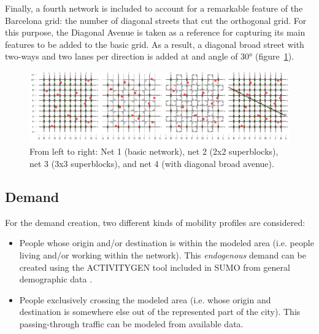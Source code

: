 \documentclass[11pt]{article}
\begin{document}
Finally, a fourth network is included to account for a remarkable feature of the Barcelona grid: the number of diagonal streets that cut the orthogonal grid. For this purpose, the Diagonal Avenue is taken as a reference for capturing its main features to be added to the basic grid. As a result, a diagonal broad street with two-ways and two lanes per direction is added at and angle of 30° (figure~\ref{fig:4nets}).

\begin{figure}[htbp]
\centering
\includegraphics[width=\textwidth]{bcn_paradox_4nets.PNG}
\caption{From left to right: Net 1 (basic network), net 2 (2x2 superblocks), net 3 (3x3 superblocks), and net 4 (with diagonal broad avenue).}
\label{fig:4nets}
\end{figure}


\begin{table}[htbp]
\centering
\caption{Main metrics for each network.}
\label{tab:1Nets-features}
\end{table}

\subsection {Demand}

For the demand creation, two different kinds of mobility profiles are considered:
\begin{itemize}
\setlength\itemsep{0.05em}
    \item People whose origin and/or destination is within the modeled area (i.e. people living and/or working within the network). This \textit{endogenous} demand can be created using the ACTIVITYGEN tool included in SUMO from general demographic data \citep{Lopez2018}.
    \item People exclusively crossing the modeled area (i.e. whose origin and destination is somewhere else out of the represented part of the city). This passing-through traffic can be modeled from available data.
\end{itemize}
\end{document}
